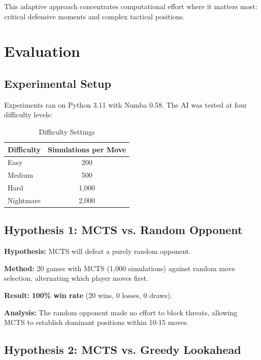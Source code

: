 \documentclass[11pt]{article}
\begin{document}
This adaptive approach concentrates computational effort where it matters most: critical defensive moments and complex tactical positions.

\section{Evaluation}

\subsection{Experimental Setup}

Experiments ran on Python 3.11 with Numba 0.58. The AI was tested at four difficulty levels:

\begin{table}[H]
\centering
\caption{Difficulty Settings}
\begin{tabular}{lc}
\toprule
\textbf{Difficulty} & \textbf{Simulations per Move} \\
\midrule
Easy & 200 \\
Medium & 500 \\
Hard & 1,000 \\
Nightmare & 2,000 \\
\bottomrule
\end{tabular}
\end{table}

\subsection{Hypothesis 1: MCTS vs. Random Opponent}

\textbf{Hypothesis:} MCTS will defeat a purely random opponent.

\textbf{Method:} 20 games with MCTS (1,000 simulations) against random move selection, alternating which player moves first.

\textbf{Result:} \textbf{100\% win rate} (20 wins, 0 losses, 0 draws).

\textbf{Analysis:} The random opponent made no effort to block threats, allowing MCTS to establish dominant positions within 10-15 moves.

\subsection{Hypothesis 2: MCTS vs. Greedy Lookahead}
\end{document}
